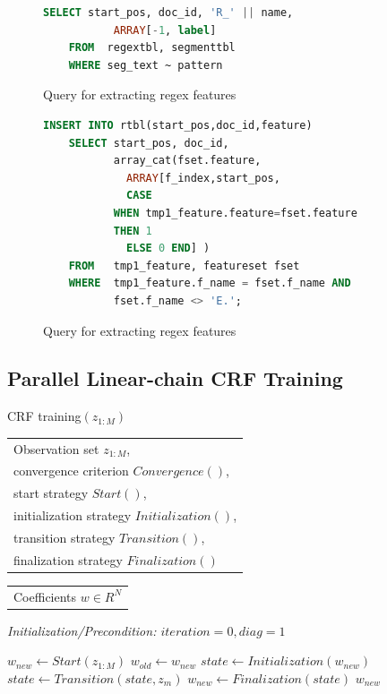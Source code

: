 \documentclass[11pt,letterpaper]{article}
\newlength{\alglabelwidth}
\newcommand{\alginput}[1]{%
\par\noindent%
\settowidth{\alglabelwidth}{\emph{Output:}}%
\makebox[\alglabelwidth][l]{\emph{Input:}} \begin{tabular}[t]{l} #1 \end{tabular}}
\newcommand{\algoutput}[1]{%
\par\noindent%
\settowidth{\alglabelwidth}{\emph{Output:}}%
\makebox[\alglabelwidth][l]{\emph{Output:}} \begin{tabular}[t]{l} #1 \end{tabular}}
\newcommand{\algprecond}[1]{%
\par\noindent\textit{Initialization/Precondition: #1}}
\begin{document}
\begin{figure}
\centering
\begin{lstlisting}[language=SQL,gobble=4, breaklines=true]
    SELECT start_pos, doc_id, 'R_' || name, 
           ARRAY[-1, label]
    FROM  regextbl, segmenttbl
    WHERE seg_text ~ pattern
\end{lstlisting}
\caption{Query for extracting regex features}
\end{figure}


\begin{figure}
\centering
\begin{lstlisting}[language=SQL,gobble=4, breaklines=true]
    INSERT INTO rtbl(start_pos,doc_id,feature)
    SELECT start_pos, doc_id, 
           array_cat(fset.feature, 
		     ARRAY[f_index,start_pos, 
		     CASE 
           WHEN tmp1_feature.feature=fset.feature 
           THEN 1
		     ELSE 0 END] )
    FROM   tmp1_feature, featureset fset
    WHERE  tmp1_feature.f_name = fset.f_name AND 
           fset.f_name <> 'E.';
\end{lstlisting}
\caption{Query for extracting regex features}
\end{figure}


\subsection{Parallel Linear-chain CRF Training}
\begin{algorithm} 
\caption{CRF training$(z_{1:M})$} \label{alg:CRF training}
\alginput{Observation set $z_{1:M}$,\\
convergence criterion $\mathit{Convergence}()$,\\
start strategy $\mathit{Start}()$,\\
initialization strategy $\mathit{Initialization}()$,\\
transition strategy $\mathit{Transition}()$,\\
finalization strategy $\mathit{Finalization}()$}
\algoutput{Coefficients $w \in R^N$}
\algprecond{$iteration = 0, diag = 1$}
\begin{algorithmic}[1]
\State $w_{new} \gets \mathit{Start}(z_{1:M})$
\Repeat
        \State $w_{old} \gets w_{new}$
        \State $\mathit{state} \gets \mathit{Initialization}(w_{new})$
 
\State $\mathit{state} \gets \mathit{Transition}(\mathit{state}, z_m)$
\EndFor
\State $w_{new} \gets Finalization(\mathit{state})$ 
    \State \Return $w_{new}$
\end{algorithmic}
\end{algorithm}
\end{document}
